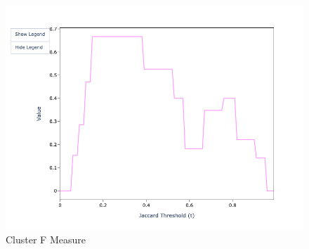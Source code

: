 \documentclass[11pt]{article}
\begin{document}
\begin{figure}[h!]
\begin{minipage}{0.32\textwidth}
            \includegraphics[width=\textwidth]{sample-usage/mini-alg-cf}
            \caption{Cluster F Measure}
        \end{minipage}
    \end{figure}
\end{document}
